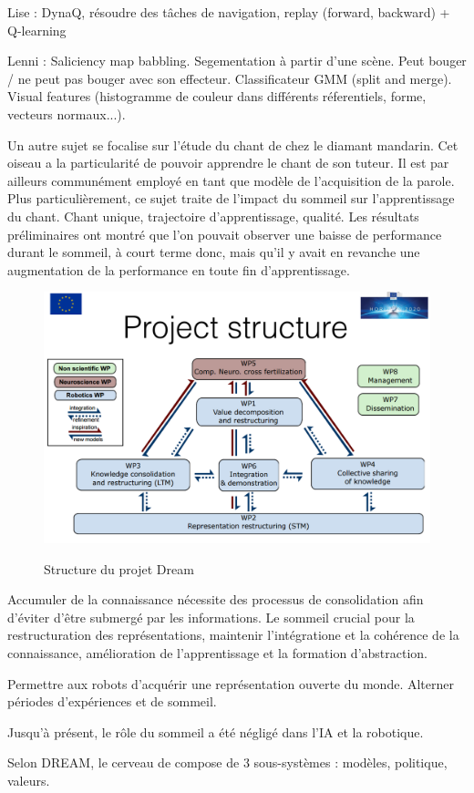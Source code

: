 \documentclass{llncs}
\begin{document}
Lise : DynaQ, résoudre des tâches de navigation, replay (forward, backward) + Q-learning

Lenni : Saliciency map babbling. Segementation à partir d'une scène. Peut bouger / ne peut pas bouger avec son effecteur.
 Classificateur GMM (split and merge). Visual features (histogramme de couleur dans différents réferentiels, forme, vecteurs normaux...).

Un autre sujet se focalise sur l'étude du chant de chez le diamant mandarin. Cet oiseau a la particularité de pouvoir apprendre le chant de son tuteur. Il est par ailleurs communément employé en tant que modèle de l'acquisition de la parole. Plus particulièrement, ce sujet traite de l'impact du sommeil sur l'apprentissage du chant. Chant unique, trajectoire d'apprentissage, qualité.
Les résultats préliminaires ont montré que l'on pouvait observer une baisse de performance durant le sommeil, à court terme donc, mais qu'il y avait en revanche une  augmentation de la performance en toute fin d'apprentissage.

\begin{figure}
	\centering
	\includegraphics[width=.7\textwidth]{figures/project_structure.png}
	\label{fig:dream}
	\caption{Structure du projet Dream}
\end{figure}

Accumuler de la connaissance nécessite des processus de consolidation afin d'éviter d'être submergé par les informations. Le sommeil crucial pour la restructuration des représentations, maintenir l'intégratione et la cohérence de la connaissance, amélioration de l'apprentissage et la formation d'abstraction.

Permettre aux robots d'acquérir une représentation ouverte du monde. Alterner périodes d'expériences et de sommeil.

Jusqu'à présent, le rôle du sommeil a été négligé dans l'IA et la robotique.

Selon DREAM, le cerveau de compose de 3 sous-systèmes : modèles, politique, valeurs.
\end{document}
